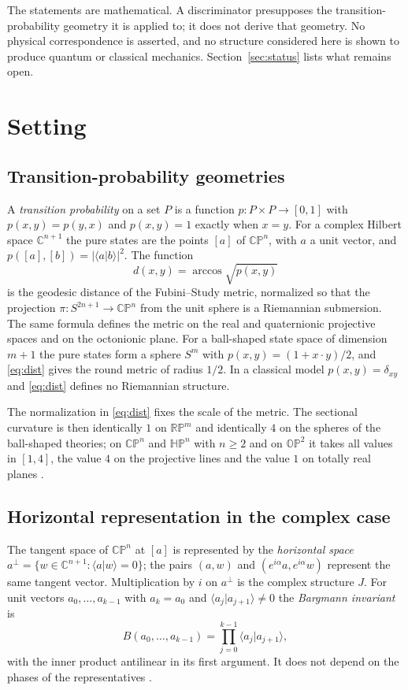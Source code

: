 The statements are mathematical. A discriminator presupposes the transition-probability geometry it is applied to; it does not derive that geometry. No physical correspondence is asserted, and no structure considered here is shown to produce quantum or classical mechanics. Section~\ref{sec:status} lists what remains open.

\section{Setting}\label{sec:setting}

\subsection{Transition-probability geometries}
A \emph{transition probability} on a set $P$ is a function $p\colon P\times P\to[0,1]$ with $p(x,y)=p(y,x)$ and $p(x,y)=1$ exactly when $x=y$. For a complex Hilbert space $\mathbb{C}^{n+1}$ the pure states are the points $[a]$ of $\mathbb{CP}^n$, with $a$ a unit vector, and $p([a],[b])=|\langle a|b\rangle|^2$. The function
\begin{equation}\label{eq:dist}
d(x,y)=\arccos\sqrt{p(x,y)}
\end{equation}
is the geodesic distance of the Fubini--Study metric, normalized so that the projection $\pi\colon S^{2n+1}\to\mathbb{CP}^n$ from the unit sphere is a Riemannian submersion. The same formula defines the metric on the real and quaternionic projective spaces and on the octonionic plane. For a ball-shaped state space of dimension $m+1$ the pure states form a sphere $S^m$ with $p(x,y)=(1+x\cdot y)/2$, and \eqref{eq:dist} gives the round metric of radius $1/2$. In a classical model $p(x,y)=\delta_{xy}$ and \eqref{eq:dist} defines no Riemannian structure.

The normalization in \eqref{eq:dist} fixes the scale of the metric. The sectional curvature is then identically $1$ on $\mathbb{RP}^m$ and identically $4$ on the spheres of the ball-shaped theories; on $\mathbb{CP}^n$ and $\mathbb{HP}^n$ with $n\ge2$ and on $\mathbb{OP}^2$ it takes all values in $[1,4]$, the value $4$ on the projective lines and the value $1$ on totally real planes \cite{besse,gorodski}.

\subsection{Horizontal representation in the complex case}
The tangent space of $\mathbb{CP}^n$ at $[a]$ is represented by the \emph{horizontal space} $a^\perp=\{w\in\mathbb{C}^{n+1}:\langle a|w\rangle=0\}$; the pairs $(a,w)$ and $(e^{i\alpha}a,e^{i\alpha}w)$ represent the same tangent vector. Multiplication by $i$ on $a^\perp$ is the complex structure $J$. For unit vectors $a_0,\dots,a_{k-1}$ with $a_k=a_0$ and $\langle a_j|a_{j+1}\rangle\neq0$ the \emph{Bargmann invariant} is
\begin{equation}\label{eq:bargmann}
B(a_0,\dots,a_{k-1})=\prod_{j=0}^{k-1}\langle a_j|a_{j+1}\rangle ,
\end{equation}
with the inner product antilinear in its first argument. It does not depend on the phases of the representatives \cite{bargmann,mukundasimon}.

